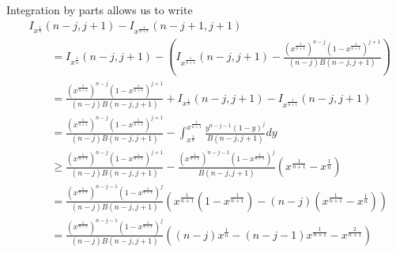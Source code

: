 \documentclass[12pt]{article}
\newcommand{\xn}{x^{\frac{1}{n}}}
\newcommand{\xnone}{x^{\frac{1}{n+1}}}
\begin{document}
Integration by parts allows us to write
\begin{align*}
&I_{\xn}(n-j, j+1) - I_{\xnone}(n-j+1, j+1) \\ 
  &\qquad= I_{\xn}(n-j, j+1) - \left(I_{\xnone}(n-j, j+1) - \frac{\left(\xnone\right)^{n-j}\left(1-\xnone\right)^{j+1}}{(n-j)B(n-j,j+1)}\right) \\
  &\qquad= \frac{\left(\xnone\right)^{n-j}\left(1-\xnone\right)^{j+1}}{(n-j)B(n-j,j+1)} + I_{\xn}(n-j, j+1) - I_{\xnone}(n-j, j+1) \\
  &\qquad= \frac{\left(\xnone\right)^{n-j}\left(1-\xnone\right)^{j+1}}{(n-j)B(n-j,j+1)} - \int_{\xn}^{\xnone} \frac{y^{n-j-1}(1-y)^{j}}{B(n-j,j+1)}dy \\
  &\qquad\geq \frac{\left(\xnone\right)^{n-j}\left(1-\xnone\right)^{j+1}}{(n-j)B(n-j,j+1)} - \frac{\left(\xnone\right)^{n-j-1}\left(1-\xnone\right)^{j}}{B(n-j,j+1)}\left(\xnone - \xn\right) \\
  &\qquad= \frac{\left(\xnone\right)^{n-j-1}\left(1-\xnone\right)^{j}}{(n-j)B(n-j,j+1)}\left(\xnone(1 - \xnone) - (n-j)(\xnone - \xn)\right) \\
  &\qquad= \frac{\left(\xnone\right)^{n-j-1}\left(1-\xnone\right)^{j}}{(n-j)B(n-j,j+1)}\left((n-j)\xn - (n-j-1)\xnone - x^{\frac{2}{n+1}} \right)  
\end{align*}







\newpage
\end{document}
